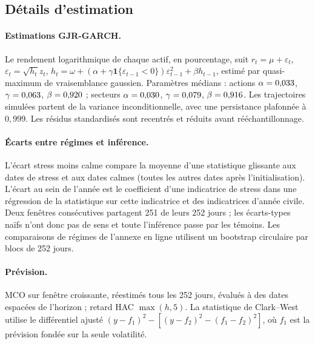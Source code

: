 \documentclass[12pt]{article}
\theoremstyle{definition}
\begin{document}
\begin{doublespace}
\section{Détails d'estimation}
\label{app:details}

\paragraph{Estimations GJR-GARCH.} Le rendement logarithmique de chaque actif,
en pourcentage, suit $r_t=\mu+\varepsilon_t$, $\varepsilon_t=\sqrt{h_t}z_t$,
$h_t=\omega+(\alpha+\gamma\mathbf 1\{\varepsilon_{t-1}<0\})
\varepsilon_{t-1}^2+\beta h_{t-1}$, estimé par quasi-maximum de
vraisemblance gaussien. Paramètres médians : actions $\alpha=0{,}033$,
$\gamma=0{,}063$, $\beta=0{,}920$ ; secteurs $\alpha=0{,}030$,
$\gamma=0{,}079$, $\beta=0{,}916$. Les trajectoires simulées partent de
la variance inconditionnelle, avec une persistance plafonnée à $0{,}999$. Les
résidus standardisés sont recentrés et réduits avant rééchantillonnage.

\paragraph{Écarts entre régimes et inférence.} L'écart stress moins calme
compare la moyenne d'une statistique glissante aux dates de stress et aux
dates calmes (toutes les autres dates après l'initialisation). L'écart au
sein de l'année est le coefficient d'une indicatrice de stress dans une
régression de la statistique sur cette indicatrice et des indicatrices
d'année civile. Deux fenêtres consécutives partagent 251 de leurs 252 jours ;
les écarts-types naïfs n'ont donc pas de sens et toute l'inférence passe par
les témoins. Les comparaisons de régimes de l'annexe en ligne utilisent un
bootstrap circulaire par blocs de 252 jours.

\paragraph{Prévision.} MCO sur fenêtre croissante, réestimés tous les 252
jours, évalués à des dates espacées de l'horizon ; retard HAC $\max(h,5)$. La
statistique de Clark--West utilise le différentiel ajusté
$(y-f_1)^2-[(y-f_2)^2-(f_1-f_2)^2]$, où $f_1$ est la prévision fondée sur la
seule volatilité.

\end{doublespace}

\begin{doublespace}
\theendnotes
\end{doublespace}
\end{document}
